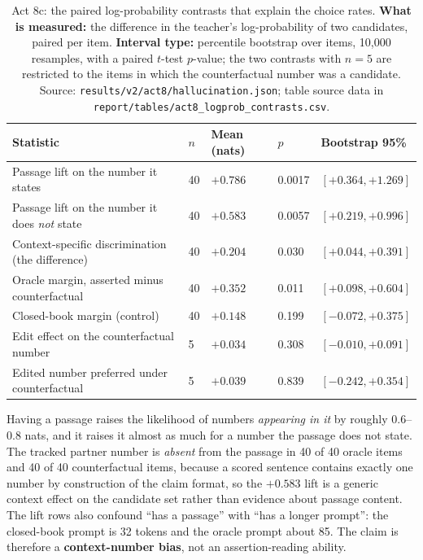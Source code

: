 \documentclass[11pt,a4paper]{article}
\begin{document}
\begin{table}[H]
\centering
\begin{tabular}{L{5.25cm}R{1.4cm}R{2.5cm}R{1.5cm}R{2.75cm}}
\toprule
Statistic & $n$ & Mean (nats) & $p$ & Bootstrap 95\% \\
\midrule
Passage lift on the number it states & 40 & $+0.786$ & 0.0017 & $[+0.364, +1.269]$ \\
Passage lift on the number it does \emph{not} state & 40 & $+0.583$ & 0.0057 & $[+0.219, +0.996]$ \\
Context-specific discrimination (the difference) & 40 & $+0.204$ & 0.030 & $[+0.044, +0.391]$ \\
Oracle margin, asserted minus counterfactual & 40 & $+0.352$ & 0.011 & $[+0.098, +0.604]$ \\
Closed-book margin (control) & 40 & $+0.148$ & 0.199 & $[-0.072, +0.375]$ \\
Edit effect on the counterfactual number & 5 & $+0.034$ & 0.308 & $[-0.010, +0.091]$ \\
Edited number preferred under counterfactual & 5 & $+0.039$ & 0.839 & $[-0.242, +0.354]$ \\
\bottomrule
\end{tabular}
\caption{Act 8c: the paired log-probability contrasts that explain the choice
rates. \textbf{What is measured:} the difference in the teacher's log-probability
of two candidates, paired per item. \textbf{Interval type:} percentile
bootstrap over items, 10,000 resamples, with a paired $t$-test $p$-value; the
two contrasts with $n = 5$ are restricted to the items in which the
counterfactual number was a candidate. Source:
\texttt{results/v2/act8/hallucination.json}; table source data in
\texttt{report/tables/act8\_logprob\_contrasts.csv}.}
\label{tab:act8c}
\end{table}

Having a passage raises the likelihood of numbers \emph{appearing in it} by
roughly 0.6--0.8 nats, and it raises it almost as much for a number the passage
does not state. The tracked partner number is \emph{absent} from the passage in
40 of 40 oracle items and 40 of 40 counterfactual items, because a scored
sentence contains exactly one number by construction of the claim format, so
the $+0.583$ lift is a generic context effect on the candidate set rather than
evidence about passage content. The lift rows also confound ``has a passage''
with ``has a longer prompt'': the closed-book prompt is 32 tokens and the
oracle prompt about 85. The claim is therefore a \textbf{context-number bias},
not an assertion-reading ability.
\end{document}
